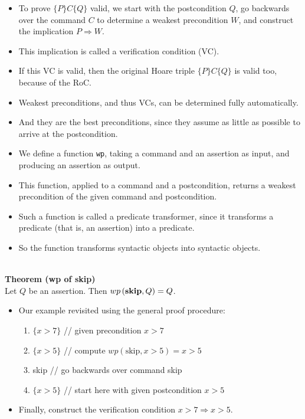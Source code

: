 \begin{multicols}{2}
\begin{itemize}
  \item To prove $\{P\}C\{Q\}$ valid, we start with the postcondition $Q$, go backwards over the command $C$ to determine a weakest precondition $W$, and construct the implication $P \Rightarrow W$.
  \item This implication is called a verification condition (VC).
  \item If this VC is valid, then the original Hoare triple $\{P\}C\{Q\}$ is valid too, because of the RoC.
  \item Weakest preconditions, and thus VCs, can be determined fully automatically.
  \item And they are the best preconditions, since they assume as little as possible to arrive at the postcondition.
\end{itemize}

\begin{itemize}
  \item We define a function \lstinline{wp}, taking a command and an assertion as input, and producing an assertion as output.
  \item This function, applied to a command and a postcondition, returns a weakest precondition of the given command and postcondition.
  \item Such a function is called a predicate transformer, since it transforms a predicate (that is, an assertion) into a predicate.
  \item So the function transforms syntactic objects into syntactic objects.
\end{itemize}

\\
\textbf{Theorem (wp of skip)}\\
Let $Q$ be an assertion. Then $wp\left( \text{\textbf{skip}},Q \right) = Q$.

\begin{itemize}
  \item Our example revisited using the general proof procedure:
\begin{enumerate}
  \item $\{x>7\}$ // given precondition $x>7$
  \item $\{x>5\}$ // compute $wp\left(\text{skip}, x>5\right) = x>5$
  \item skip      // go backwards over command skip
  \item $\{x>5\}$ // start here with given postcondition $x>5$
\end{enumerate}
  \item Finally, construct the verification condition $x>7 \Rightarrow x>5$.
\end{itemize}


\end{multicols}
